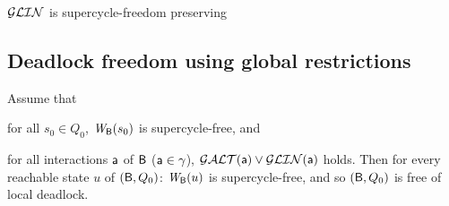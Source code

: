 \bt \label{thm:GLin.SC-free-preserving}
$\mathcal{GLIN}$ is supercycle-freedom preserving
\et
%





\subsection{Deadlock freedom using global restrictions}


\label{theorem:global.deadlock-free}
Assume that
\bn
\item \label{theorem:global.deadlock-free.initial}
      for all $s_0 \in Q_0$, $\mathit{W}_{\mathsf{B}}({s_0})$ is supercycle-free, and
\item \label{theorem:global.deadlock-free.scfPres}
      for all interactions $\mathsf{a}$ of $\mathsf{B}$ (\ie $\mathsf{a} \in \gamma$),  $\mathcal{GALT}(\mathsf{a}) \lor \mathcal{GLIN}(\mathsf{a})$ holds.
\en
Then for every reachable state $u$ of $(\mathsf{B}, Q_0)$:  $\mathit{W}_{\mathsf{B}}({u})$ is supercycle-free, and so 
$(\mathsf{B}, Q_0)$ is free of local deadlock.
\eco
{}








